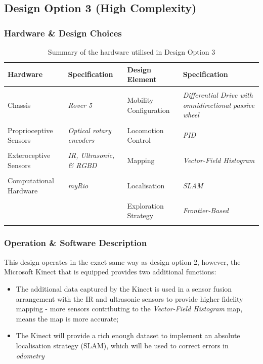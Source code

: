 \documentclass[a4paper]{article}
\begin{document}
\subsection{Design Option 3 (High Complexity)}
\subsubsection{Hardware \& Design Choices}
\begin{table}[h]
\centering
\caption{Summary of the hardware utilised in Design Option 3}\footnotesize
\begin{tabular}{p{3.5cm}p{3.8cm}p{3.5cm}p{3.8cm}}
\toprule
\textbf{Hardware} & \textbf{Specification} & \textbf{Design Element} & \textbf{Specification}\\
\midrule
& & &\\
Chassis  & \textit{Rover 5} & Mobility Configuration & \textit{Differential Drive with omnidirectional passive wheel}\\
& & &\\
Proprioceptive Sensors & \textit{Optical rotary encoders} & Locomotion Control & \textit{PID}\\
& & &\\
Exteroceptive Sensors & \textit{IR, Ultrasonic, \& RGBD} & Mapping & \textit{Vector-Field Histogram}\\
& & & \\
Computational Hardware & \textit{myRio} & Localisation & \textit{SLAM}\\
& & & \\
 & & Exploration Strategy & \textit{Frontier-Based}\\
& & & \\
\bottomrule
\end{tabular}
\end{table}

\subsubsection{Operation \& Software Description}
This design operates in the exact same way as design option 2, however, the Microsoft Kinect that is equipped provides two additional functions:
\begin{itemize}
\item The additional data captured by the Kinect is used in a sensor fusion arrangement with the IR and ultrasonic sensors to provide higher fidelity mapping - more sensors contributing to the \textit{Vector-Field Histogram} map, means the map is more accurate;
\item The Kinect will provide a rich enough dataset to implement an absolute localisation strategy (SLAM), which will be used to correct errors in \textit{odometry}
\end{itemize}
\end{document}
